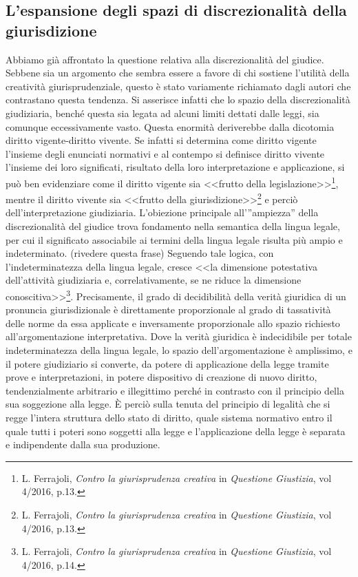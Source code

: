 \subsection{L’espansione degli spazi di discrezionalità della giurisdizione}
Abbiamo già affrontato la questione relativa alla discrezionalità del giudice. Sebbene sia un argomento che sembra essere a favore di chi sostiene l’utilità della creatività giurisprudenziale, questo è stato variamente richiamato dagli autori che contrastano questa tendenza. Si asserisce infatti che lo spazio della discrezionalità giudiziaria, benché questa sia legata ad alcuni limiti dettati dalle leggi, sia comunque eccessivamente vasto. Questa enormità deriverebbe dalla dicotomia diritto vigente-diritto vivente. Se infatti si determina come diritto vigente l’insieme degli enunciati normativi e al contempo si definisce diritto vivente l’insieme dei loro significati, risultato della loro interpretazione e applicazione, si può ben evidenziare come il diritto vigente sia <<frutto della legislazione>>\footnote{L. Ferrajoli, \textit{Contro la giurisprudenza creativa} in \textit{Questione Giustizia}, vol 4/2016, p.13.}, mentre il diritto vivente sia <<frutto della giurisdizione>>\footnote{L. Ferrajoli, \textit{Contro la giurisprudenza creativa} in \textit{Questione Giustizia}, vol 4/2016, p.13.} e perciò dell’interpretazione giudiziaria.
L’obiezione principale all’”ampiezza” della discrezionalità del giudice trova fondamento nella semantica della lingua legale, per cui il significato associabile ai termini della lingua legale risulta più ampio e indeterminato. (rivedere questa frase)
Seguendo tale logica, con l’indeterminatezza della lingua legale, cresce <<la dimensione potestativa dell’attività giudiziaria e, correlativamente, se ne riduce la dimensione conoscitiva>>\footnote{L. Ferrajoli, \textit{Contro la giurisprudenza creativa} in \textit{Questione Giustizia}, vol 4/2016, p.14.}. 
Precisamente, il grado di decidibilità della verità giuridica di un pronuncia giurisdizionale è direttamente proporzionale al grado di tassatività delle norme da essa applicate e inversamente proporzionale allo spazio richiesto all’argomentazione interpretativa. Dove la verità giuridica è indecidibile per totale indeterminatezza della lingua legale, lo spazio dell’argomentazione è amplissimo, e il potere giudiziario si converte, da potere di applicazione della legge tramite prove e interpretazioni, in potere dispositivo di creazione di nuovo diritto, tendenzialmente arbitrario e illegittimo perché in contrasto con il principio della sua soggezione alla legge. È perciò sulla tenuta del principio di legalità che si regge l’intera struttura dello stato di diritto, quale sistema normativo entro il quale tutti i poteri sono soggetti alla legge e l’applicazione della legge è separata e indipendente dalla sua produzione.
